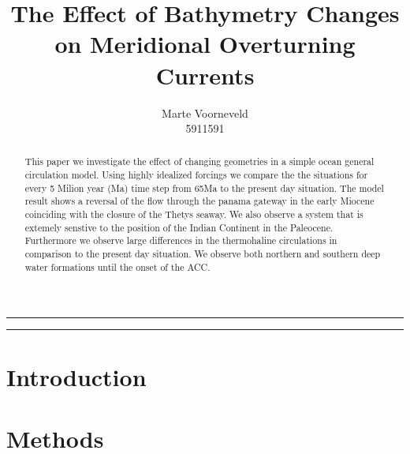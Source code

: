\documentclass[a4paper]{article}
\title{The Effect of Bathymetry Changes on Meridional Overturning Currents}
\author{Marte Voorneveld\\
		5911591}
\begin{document}
\maketitle
\noindent\rule{\textwidth}{1pt}
\begin{abstract}
This paper we investigate the effect of changing geometries in a simple ocean general circulation model. Using highly idealized forcings we compare the the situations for every 5 Milion year (Ma) time step from 65Ma to the present day situation. The model result shows a reversal of the flow through the panama gateway in the early Miocene coinciding with the closure of the Thetys seaway. We also observe a system that is extemely senstive to the position of the Indian Continent in the Paleocene. Furthermore we observe large differences in the thermohaline circulations in comparison to the present day situation. We observe both northern and southern deep water formations until the onset of the ACC.
\end{abstract}
\noindent\rule{\textwidth}{1pt}
\begin{multicols}{2}
\section{Introduction}


\section{Methods}







\end{multicols}
\end{document}
